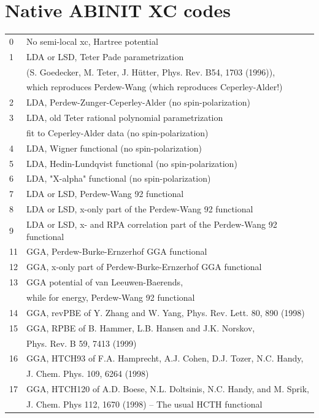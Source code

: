 \documentclass[a4paper,11pt]{report}
\begin{document}
\section{Native ABINIT XC codes}
\begin{longtable}{ll}
0   & No semi-local xc, Hartree potential\\
1   & LDA or LSD, Teter Pade parametrization\\
    & (S. Goedecker, M. Teter, J. H\"utter, Phys. Rev. B54, 1703 (1996)),\\
    & which reproduces Perdew-Wang (which reproduces Ceperley-Alder!)\\
2   & LDA, Perdew-Zunger-Ceperley-Alder (no spin-polarization)\\
3   & LDA, old Teter rational polynomial parametrization\\
    & fit to Ceperley-Alder data (no spin-polarization)\\
4   & LDA, Wigner functional (no spin-polarization)\\
5   & LDA, Hedin-Lundqvist functional (no spin-polarization)\\
6   & LDA, "X-alpha" functional (no spin-polarization)\\
7   & LDA or LSD, Perdew-Wang 92 functional\\
8   & LDA or LSD, x-only part of the Perdew-Wang 92 functional\\
9   & LDA or LSD, x- and RPA correlation part of the Perdew-Wang 92 functional\\
11  & GGA, Perdew-Burke-Ernzerhof GGA functional\\
12  & GGA, x-only part of Perdew-Burke-Ernzerhof GGA functional\\
13  & GGA potential of van Leeuwen-Baerends,\\
    & while for energy, Perdew-Wang 92 functional\\
14  & GGA, revPBE of Y. Zhang and W. Yang, Phys. Rev. Lett. 80, 890 (1998)\\
15  & GGA, RPBE of B. Hammer, L.B. Hansen and J.K. Norskov,\\
    & Phys. Rev. B 59, 7413 (1999)\\
16  & GGA, HTCH93 of F.A. Hamprecht, A.J. Cohen, D.J. Tozer, N.C. Handy,\\
    & J. Chem. Phys. 109, 6264 (1998)\\
17  & GGA, HTCH120 of A.D. Boese, N.L. Doltsinis, N.C. Handy, and M. Sprik,\\
    & J. Chem. Phys 112, 1670 (1998) -- The usual HCTH functional\\

\end{longtable}
\end{document}
